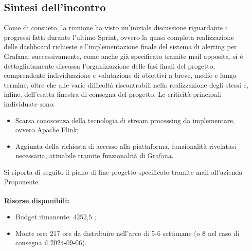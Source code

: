 \documentclass[8pt]{article}
\begin{document}
\subsection{Sintesi dell'incontro}
Come di consueto, la riunione ha visto un'iniziale discussione riguardante i progressi fatti durante l'ultimo Sprint, ovvero la quasi completa realizzazione delle dashboard richieste e l'implementazione finale del sistema di alerting per Grafana; successivamente, come anche già specificato tramite mail apposita, si è dettagliatamente discussa l'organizzazione delle fasi finali del progetto, comprendente individuazione e valutazione di obiettivi a breve, medio e lungo termine, oltre che alle varie difficoltà riscontrabili nella realizzazione degli  stessi e, infine, dell'esatta finestra di consegna del progetto. Le criticità principali individuate sono:
\begin{itemize}
\setlength\itemsep{0em}
    \item Scarsa conoscenza della tecnologia di stream processing da implementare, ovvero Apache Flink;
    \item Aggiunta della richiesta di accesso alla piattaforma, funzionalità rivelatasi necessaria, attuabile tramite funzionalità di Grafana.
\end{itemize}   
Si riporta di seguito il piano di fine progetto specificato tramite mail all'azienda Proponente.\\\\
\setlength\parindent{0pt}
\textbf{Risorse disponibili:}
\begin{itemize}
\setlength\itemsep{0em}
    \item Budget rimanente: 4252,5 \texteuro;
    \item Monte ore: 217 ore da distribuire nell'arco di 5-6 settimane (o 8 nel caso di consegna il 2024-09-06).
\end{itemize} 
\end{document}
